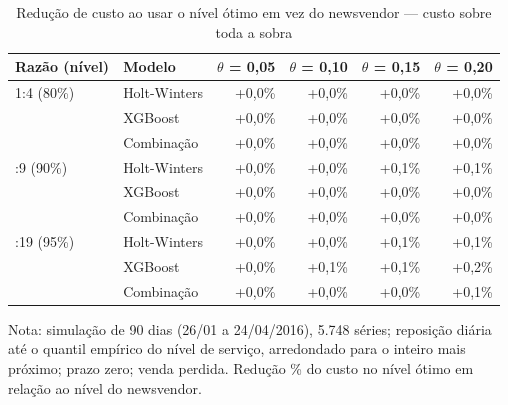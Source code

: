 \begin{table}[htbp]
\centering
\small
\caption{Redução de custo ao usar o nível ótimo em vez do newsvendor — custo sobre toda a sobra}
\label{tab:sim_nivel_otimo_toda_sobra_economia}
\begin{tabular}{llrrrr}
\toprule
Razão (nível) & Modelo & $\theta$ = 0,05 & $\theta$ = 0,10 & $\theta$ = 0,15 & $\theta$ = 0,20 \\
\midrule
1:4 (80\%) & Holt-Winters & +0,0\% & +0,0\% & +0,0\% & +0,0\% \\
 & XGBoost & +0,0\% & +0,0\% & +0,0\% & +0,0\% \\
 & Combinação & +0,0\% & +0,0\% & +0,0\% & +0,0\% \\
\addlinespace
1:9 (90\%) & Holt-Winters & +0,0\% & +0,0\% & +0,1\% & +0,1\% \\
 & XGBoost & +0,0\% & +0,0\% & +0,0\% & +0,0\% \\
 & Combinação & +0,0\% & +0,0\% & +0,0\% & +0,0\% \\
\addlinespace
1:19 (95\%) & Holt-Winters & +0,0\% & +0,0\% & +0,1\% & +0,1\% \\
 & XGBoost & +0,0\% & +0,1\% & +0,1\% & +0,2\% \\
 & Combinação & +0,0\% & +0,0\% & +0,0\% & +0,1\% \\
\bottomrule
\end{tabular}
\par\smallskip
{\footnotesize Nota: simulação de 90 dias (26/01 a 24/04/2016), 5.748 séries; reposição diária até o quantil empírico do nível de serviço, arredondado para o inteiro mais próximo; prazo zero; venda perdida. Redução \% do custo no nível ótimo em relação ao nível do newsvendor.}
\end{table}
